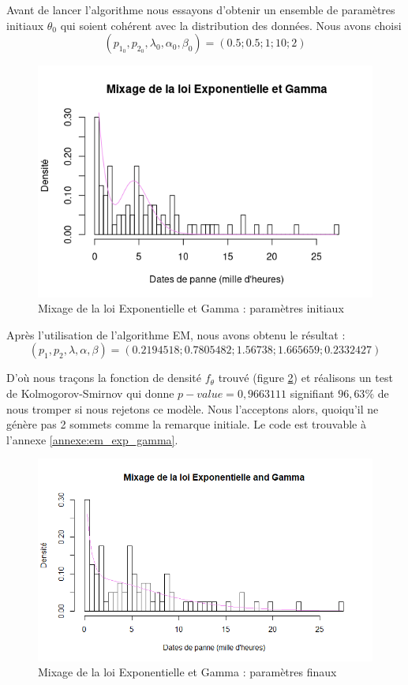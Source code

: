 \documentclass[10pt,a4paper]{article}
\begin{document}
Avant de lancer l'algorithme nous essayons d'obtenir un ensemble de paramètres initiaux $\theta_{0}$
qui soient cohérent avec la distribution des données. Nous avons choisi 
\[\left( {{p_{1_0}},{p_{2_0}},\lambda_{0} ,\alpha_{0} ,\beta_{0} } \right) = \left( {0.5;0.5;1;10;2} \right)\]

\begin{figure}[!hbt]
    \centering
    \includegraphics[width=\textwidth]{img/loi_initiale_Exp_Gamma.png}
    \caption{Mixage de la loi Exponentielle et Gamma : paramètres initiaux}
    \label{mixage_init}
\end{figure}

Après l'utilisation de l'algorithme EM, nous avons obtenu le résultat :
\[\left( {{p_1},{p_2},\lambda ,\alpha ,\beta } \right) = \left( {0.2194518;0.7805482;1.56738;1.665659;0.2332427} \right)\]

D'où nous traçons la fonction de densité $f_\theta$ trouvé (figure \ref{mixage}) et réalisons un test de Kolmogorov-Smirnov qui donne $p-value=0,9663111$ signifiant $96,63\%$ de nous tromper si nous rejetons ce modèle. Nous l'acceptons alors, quoiqu'il ne génère pas 2 sommets comme la remarque initiale. Le code est trouvable à l'annexe \ref{annexe:em_exp_gamma}.

\begin{figure}[!hbt]
    \centering
    \includegraphics[width=\textwidth]{img/EM_Exp_Gamma.png}
    \caption{Mixage de la loi Exponentielle et Gamma : paramètres finaux}
    \label{mixage}
\end{figure}
\end{document}
